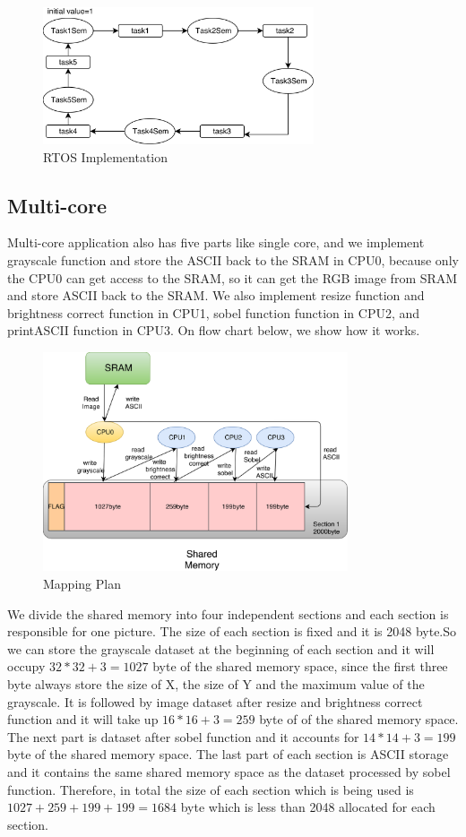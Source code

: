 \documentclass[conference,compsoc]{IEEEtran}
\begin{document}
     \begin{figure}[h]
      \centering
      \includegraphics[width=8cm]{Semaphore.eps}
      \caption{RTOS Implementation}	
      \end{figure}
      \subsection{Multi-core}
      Multi-core application also has five parts like single core, and we implement grayscale function and store the ASCII back to the SRAM in CPU0, because only the CPU0 can get access to the SRAM, so it can get the RGB image from SRAM and store ASCII back to the SRAM. We also implement resize function and brightness correct function in CPU1, sobel function function in CPU2, and printASCII function in CPU3. On flow chart below, we show how it works. 
      \begin{figure}[h]
        \centering
        \includegraphics[width=9cm]{multimodel.eps}
        \caption{Mapping Plan}	
        \end{figure}
      \par We divide the shared memory into four independent sections and each section is responsible for one picture. The size of each section is fixed and it is 2048 byte.So we can store the grayscale dataset at the beginning of each section and it will occupy $32*32+3=1027$ byte of the shared memory space, since the first three byte always store the size of X, the size of Y and the maximum value of the grayscale. It is followed by image dataset after resize and brightness correct function and it will take up $16*16+3=259$ byte of of the shared memory space. The next part is dataset after sobel function and it accounts for $14*14+3=199$ byte of the shared memory space. The last part of each section is ASCII storage and it contains the same shared memory space as the dataset processed by sobel function. Therefore, in total the size of each section which is being used is $1027+259+199+199=1684$ byte which is less than 2048 allocated for each section. 
\end{document}
